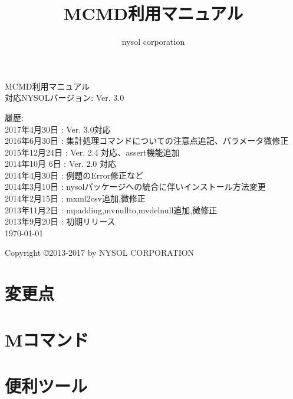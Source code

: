 \documentclass[a4paper]{jsbook}
\title{MCMD利用マニュアル}
\author{nysol corporation}
\date{}
\begin{document}
\begin{titlepage}
\begin{center}
{\huge MCMD利用マニュアル}\\
\vspace{10truept}
{\normalsize 対応NYSOLバージョン: Ver. 3.0}\\
\vspace{1cm}

履歴:\\
2017年4月30日 : Ver. 3.0対応\\
2016年6月30日 : 集計処理コマンドについての注意点追記、パラメータ微修正\\
2015年12月24日 : Ver. 2.4 対応、assert機能追加\\
2014年10月 6日 : Ver. 2.0 対応\\
2014年4月30日 : 例題のError修正など\\
2014年3月10日 : nysolパッケージへの統合に伴いインストール方法変更\\
2014年2月15日 : mxml2csv追加,微修正\\
2013年11月2日 : mpadding,mvnullto,mvdelnull追加,微修正\\
2013年9月20日 : 初期リリース\\
\vspace{13cm}
{\small \today}

{\small Copyright \copyright 2013-2017 by NYSOL CORPORATION}

\end{center}
\end{titlepage}

\setcounter{tocdepth}{1}
\label{mcmd:toc}
\tableofcontents

\chapter{変更点}


\chapter{Mコマンド}



%
%
%
%
%
%
%
%


\chapter{便利ツール}

\end{document}
